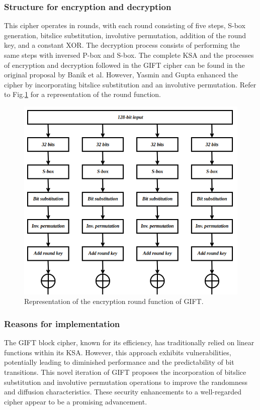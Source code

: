 \documentclass[conference]{IEEEtran}
\begin{document}
\subsubsection{Structure for encryption and decryption}

This cipher operates in rounds, with each round consisting of five steps, S-box generation, bitslice substitution, involutive permutation, addition of the round key, and a constant XOR. The decryption process consists of performing the same steps with inversed P-box and S-box. The complete KSA and the processes of encryption and decryption followed in the GIFT cipher can be found in the original proposal by Banik et al\cite{GIFT}. However, Yasmin and Gupta enhanced the cipher by incorporating bitslice substitution and an involutive permutation\cite{yasmin2023modified}. Refer to Fig.\ref{fig:GIFT-} for a representation of the round function.

\begin{figure}
    \centering
    \includegraphics[width=0.8\columnwidth]{figures/GIFT-ROUND.png}
    \caption{Representation of the encryption round function of GIFT.}
    \label{fig:GIFT-}
\end{figure}

\subsubsection{Reasons for implementation}

The GIFT block cipher, known for its efficiency, has traditionally relied on linear functions within its KSA. However, this approach exhibits vulnerabilities, potentially leading to diminished performance and the predictability of bit transitions. This novel iteration of GIFT proposes the incorporation of bitslice substitution and involutive permutation operations to improve the randomness and diffusion characteristics. These security enhancements to a well-regarded cipher appear to be a promising advancement.
\end{document}
